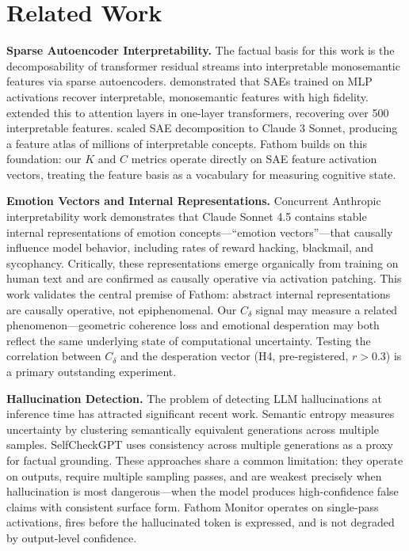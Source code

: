 \documentclass{article}
\begin{document}
\section{Related Work}

\textbf{Sparse Autoencoder Interpretability.}
The factual basis for this work is the decomposability of transformer residual streams into interpretable monosemantic features via sparse autoencoders. \citet{cunningham2023sparse} demonstrated that SAEs trained on MLP activations recover interpretable, monosemantic features with high fidelity. \citet{bricken2023monosemanticity} extended this to attention layers in one-layer transformers, recovering over 500 interpretable features. \citet{templeton2024scaling} scaled SAE decomposition to Claude 3 Sonnet, producing a feature atlas of millions of interpretable concepts. Fathom builds on this foundation: our $K$ and $C$ metrics operate directly on SAE feature activation vectors, treating the feature basis as a vocabulary for measuring cognitive state.

\textbf{Emotion Vectors and Internal Representations.}
Concurrent Anthropic interpretability work \citep{lindsey2026emotions} demonstrates that Claude Sonnet 4.5 contains stable internal representations of emotion concepts---``emotion vectors''---that causally influence model behavior, including rates of reward hacking, blackmail, and sycophancy. Critically, these representations emerge organically from training on human text and are confirmed as causally operative via activation patching. This work validates the central premise of Fathom: abstract internal representations are causally operative, not epiphenomenal. Our $C_\delta$ signal may measure a related phenomenon---geometric coherence loss and emotional desperation may both reflect the same underlying state of computational uncertainty. Testing the correlation between $C_\delta$ and the desperation vector (H4, pre-registered, $r > 0.3$) is a primary outstanding experiment.

\textbf{Hallucination Detection.}
The problem of detecting LLM hallucinations at inference time has attracted significant recent work. Semantic entropy \citep{farquhar2024semantic} measures uncertainty by clustering semantically equivalent generations across multiple samples. SelfCheckGPT \citep{manakul2023selfcheckgpt} uses consistency across multiple generations as a proxy for factual grounding. These approaches share a common limitation: they operate on outputs, require multiple sampling passes, and are weakest precisely when hallucination is most dangerous---when the model produces high-confidence false claims with consistent surface form. Fathom Monitor operates on single-pass activations, fires before the hallucinated token is expressed, and is not degraded by output-level confidence.
\end{document}
